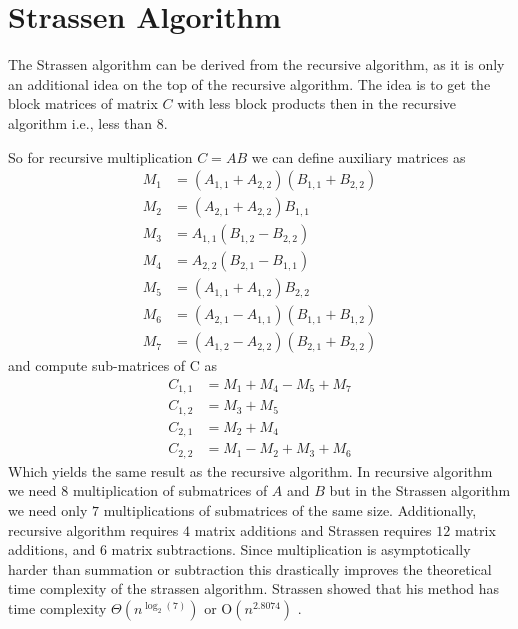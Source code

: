 \documentclass[a4paper,11pt]{article}
\begin{document}
\section{Strassen Algorithm}

The Strassen algorithm can be derived from the recursive algorithm, as it is only an additional idea on the top of the recursive algorithm.
The idea is to get the block matrices of matrix $C$ with less block products then in the recursive algorithm i.e., less than 8.

So for recursive multiplication $C=AB$ we can define auxiliary matrices as 
\begin{align*}
M_{1} &= (A_{1,1} + A_{2,2})(B_{1,1} + B_{2,2}) \\
M_{2} &= (A_{2,1} + A_{2,2})B_{1,1} \\
M_{3} &= A_{1,1}(B_{1,2} - B_{2,2}) \\
M_{4} &= A_{2,2}(B_{2,1} - B_{1,1}) \\
M_{5} &= (A_{1,1} + A_{1,2})B_{2,2} \\
M_{6} &= (A_{2,1} - A_{1,1})(B_{1,1} + B_{1,2}) \\
M_{7} &= (A_{1,2} - A_{2,2})(B_{2,1} + B_{2,2})
\end{align*}
and compute sub-matrices of C as
\begin{align*}
C_{1,1} &= M_{1} + M_{4} - M_{5} + M_{7} \\
C_{1,2} &= M_{3} + M_{5} \\
C_{2,1} &= M_{2} + M_{4} \\
C_{2,2} &= M_{1} - M_{2} + M_{3} + M_{6}
\end{align*}
Which yields the same result as the recursive algorithm.
In recursive algorithm we need $8$ multiplication of submatrices of $A$ and $B$ but in the Strassen algorithm we need only $7$ multiplications of submatrices of the same size. Additionally, recursive algorithm requires $4$ matrix additions and Strassen requires $12$ matrix additions, and $6$ matrix subtractions. Since multiplication is asymptotically harder than summation or subtraction this drastically improves the theoretical time complexity of the strassen algorithm. Strassen showed that his method has time complexity
$\Theta(n^{\log_{2}(7)})$ or $\textrm{O}(n^{2.8074})$ \cite{Pan1978a}. 

\end{document}

